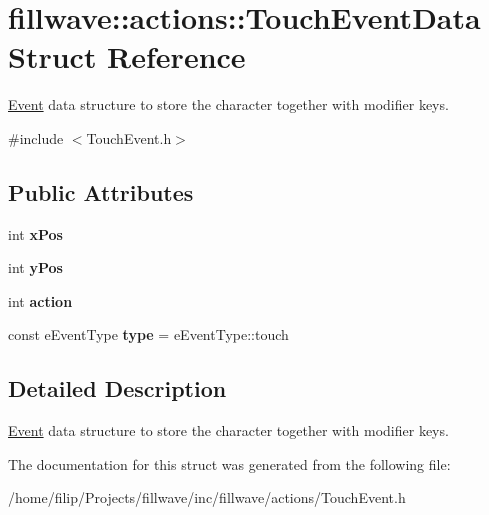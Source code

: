 \hypertarget{structfillwave_1_1actions_1_1TouchEventData}{}\section{fillwave\+:\+:actions\+:\+:Touch\+Event\+Data Struct Reference}
\label{structfillwave_1_1actions_1_1TouchEventData}


\hyperlink{classfillwave_1_1actions_1_1Event}{Event} data structure to store the character together with modifier keys.  




{\ttfamily \#include $<$Touch\+Event.\+h$>$}

\subsection*{Public Attributes}
\begin{DoxyCompactItemize}
\item 
\hypertarget{structfillwave_1_1actions_1_1TouchEventData_ae18795b3aa82e76160dfcc967aba7f08}{}int {\bfseries x\+Pos}\label{structfillwave_1_1actions_1_1TouchEventData_ae18795b3aa82e76160dfcc967aba7f08}

\item 
\hypertarget{structfillwave_1_1actions_1_1TouchEventData_a5f4f996e45e234852789f2c1c1ba8973}{}int {\bfseries y\+Pos}\label{structfillwave_1_1actions_1_1TouchEventData_a5f4f996e45e234852789f2c1c1ba8973}

\item 
\hypertarget{structfillwave_1_1actions_1_1TouchEventData_ae4c10e52c7c2c93a377b08ea5d1028ee}{}int {\bfseries action}\label{structfillwave_1_1actions_1_1TouchEventData_ae4c10e52c7c2c93a377b08ea5d1028ee}

\item 
\hypertarget{structfillwave_1_1actions_1_1TouchEventData_a1052d499649ce5b976aa0c7feff3da85}{}const e\+Event\+Type {\bfseries type} = e\+Event\+Type\+::touch\label{structfillwave_1_1actions_1_1TouchEventData_a1052d499649ce5b976aa0c7feff3da85}

\end{DoxyCompactItemize}


\subsection{Detailed Description}
\hyperlink{classfillwave_1_1actions_1_1Event}{Event} data structure to store the character together with modifier keys. 

The documentation for this struct was generated from the following file\+:\begin{DoxyCompactItemize}
\item 
/home/filip/\+Projects/fillwave/inc/fillwave/actions/Touch\+Event.\+h\end{DoxyCompactItemize}
